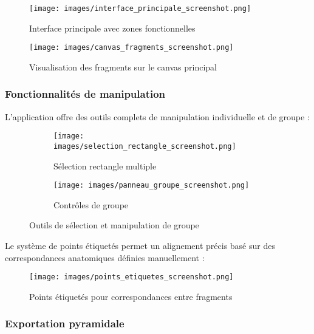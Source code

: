 \begin{figure}[H]
\centering
\texttt{[image: images/interface\_principale\_screenshot.png]}
\caption{Interface principale avec zones fonctionnelles}
\end{figure}

\begin{figure}[H]
\centering
\texttt{[image: images/canvas\_fragments\_screenshot.png]}
\caption{Visualisation des fragments sur le canvas principal}
\end{figure}

\subsubsection{Fonctionnalités de manipulation}

L'application offre des outils complets de manipulation individuelle et de groupe :

\begin{figure}[H]
\centering
\begin{subfigure}{0.48\textwidth}
\texttt{[image: images/selection\_rectangle\_screenshot.png]}
\caption{Sélection rectangle multiple}
\end{subfigure}
\hfill
\begin{subfigure}{0.48\textwidth}
\texttt{[image: images/panneau\_groupe\_screenshot.png]}
\caption{Contrôles de groupe}
\end{subfigure}
\caption{Outils de sélection et manipulation de groupe}
\end{figure}

Le système de points étiquetés permet un alignement précis basé sur des correspondances anatomiques définies manuellement :

\begin{figure}[H]
\centering
\texttt{[image: images/points\_etiquetes\_screenshot.png]}
\caption{Points étiquetés pour correspondances entre fragments}
\end{figure}

\subsubsection{Exportation pyramidale}

